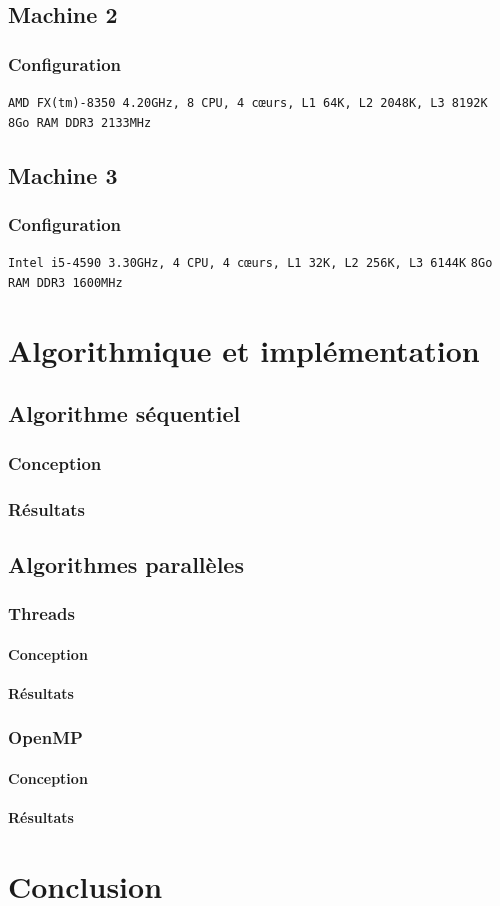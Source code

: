 \documentclass[12pt]{article}
\begin{document}
\subsection{Machine 2}
\subsubsection{Configuration}
\texttt{AMD FX(tm)-8350 4.20GHz, 8 CPU, 4 cœurs, L1 64K, L2 2048K, L3 8192K}
\texttt{8Go RAM DDR3 2133MHz}

\subsection{Machine 3}
\subsubsection{Configuration}
\texttt{Intel i5-4590 3.30GHz, 4 CPU, 4 cœurs, L1 32K, L2 256K, L3 6144K}
\texttt{8Go RAM DDR3 1600MHz}

\section{Algorithmique et implémentation}
	\subsection{Algorithme séquentiel}
		\subsubsection{Conception}
		\subsubsection{Résultats}

	\subsection{Algorithmes parallèles}
		\subsubsection{Threads}
			\paragraph{Conception}
			\paragraph{Résultats}

		\subsubsection{OpenMP}
			\paragraph{Conception}
			\paragraph{Résultats}

\section{Conclusion}

\newpage


\end{document}

